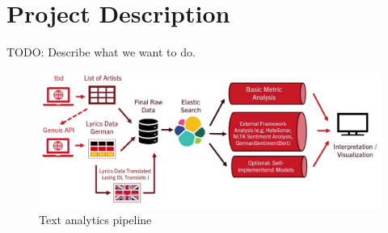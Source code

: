 \section{Project Description}

TODO: Describe what we want to do.

\begin{figure}[!htb]
    \centering
    \includegraphics[width=\textwidth]{figures/pipeline.jpg}
    \caption[]{Text analytics pipeline}
    \label{fig:pipeline}
  \end{figure}
  